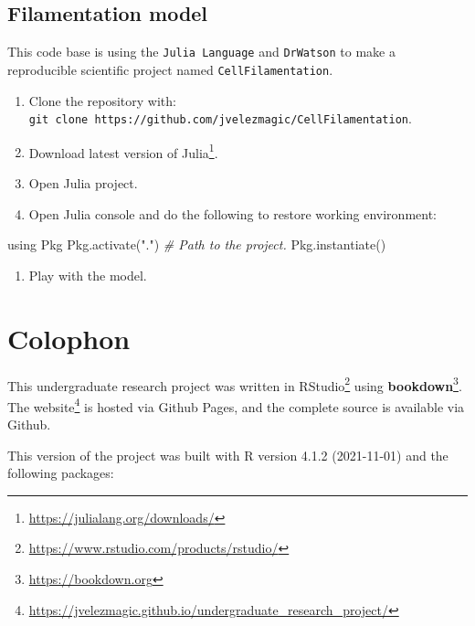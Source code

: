 \documentclass[
  12pt,
  a4paper,
  oneside]{krantz}
\newenvironment{Shaded}{\begin{snugshade}}{\end{snugshade}}
\newcommand{\CommentTok}[1]{\textcolor[rgb]{0.56,0.35,0.01}{\textit{#1}}}
\newcommand{\NormalTok}[1]{#1}
\newcommand{\StringTok}[1]{\textcolor[rgb]{0.31,0.60,0.02}{#1}}
\providecommand{\tightlist}{%
  \setlength{\itemsep}{0pt}\setlength{\parskip}{0pt}}
\renewcommand{\href}[2]{#2\footnote{\url{#1}}}
\begin{document}
\hypertarget{filamentation-model-1}{%
\section{Filamentation model}\label{filamentation-model-1}}

This code base is using the \texttt{Julia\ Language} and \texttt{DrWatson} to make a
reproducible scientific project named \texttt{CellFilamentation}.

\begin{enumerate}
\def\labelenumi{\arabic{enumi}.}
\tightlist
\item
  Clone the repository with:
  \texttt{git\ clone\ https://github.com/jvelezmagic/CellFilamentation}.
\item
  Download latest version of
  \href{https://julialang.org/downloads/}{Julia}.
\item
  Open Julia project.
\item
  Open Julia console and do the following to restore working
  environment:
\end{enumerate}

\begin{Shaded}
\begin{Highlighting}[]
\NormalTok{using Pkg}
\NormalTok{Pkg.activate(}\StringTok{"."}\NormalTok{) }\CommentTok{# Path to the project.}
\NormalTok{Pkg.instantiate()}
\end{Highlighting}
\end{Shaded}

\begin{enumerate}
\def\labelenumi{\arabic{enumi}.}
\setcounter{enumi}{4}
\tightlist
\item
  Play with the model.
\end{enumerate}

\hypertarget{colophon}{%
\chapter{Colophon}\label{colophon}}

This undergraduate research project was written in
\href{https://www.rstudio.com/products/rstudio/}{RStudio}
using \href{https://bookdown.org}{\textbf{bookdown}}.
The \href{https://jvelezmagic.github.io/undergraduate_research_project/}{website} is
hosted via Github Pages, and the complete source is
available via Github.

This version of the project was built with R version 4.1.2 (2021-11-01) and the
following packages:
\end{document}
